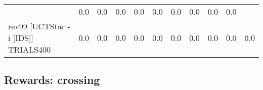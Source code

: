 \documentclass{article}
\begin{document}
\begin{tabular}{|l|r@{$\pm$}rr@{$\pm$}rr@{$\pm$}rr@{$\pm$}rr@{$\pm$}rr@{$\pm$}rr@{$\pm$}rr@{$\pm$}rr@{$\pm$}rr@{$\pm$}r|}
& \multicolumn{2}{c}{0.0}
& \multicolumn{2}{c}{0.0}
& \multicolumn{2}{c}{0.0}
& \multicolumn{2}{c}{0.0}
& \multicolumn{2}{c}{0.0}
& \multicolumn{2}{c}{0.0}
& \multicolumn{2}{c}{0.0}
& \multicolumn{2}{c}{0.0}
& \multicolumn{2}{c|}{0.0}
\\
rev99 [UCTStar -i [IDS]] TRIALS400
& \multicolumn{2}{c}{0.0}
& \multicolumn{2}{c}{0.0}
& \multicolumn{2}{c}{0.0}
& \multicolumn{2}{c}{0.0}
& \multicolumn{2}{c}{0.0}
& \multicolumn{2}{c}{0.0}
& \multicolumn{2}{c}{0.0}
& \multicolumn{2}{c}{0.0}
& \multicolumn{2}{c}{0.0}
& \multicolumn{2}{c|}{0.0}
\\
\hline
\end{tabular}%

\bigskip

\subsection*{Rewards: crossing}
\end{document}
